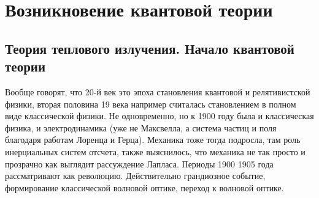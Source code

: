 \documentclass[a4paper, 12pt]{article}
\begin{document}

\section{Возникновение квантовой теории}

\subsection{Теория теплового излучения. Начало квантовой теории}

Вообще говорят, что 20-й век это эпоха становления квантовой 
и релятивистской физики, вторая половина 19 века например считалась 
становлением в полном виде классической физики. Не одновременно, но 
к 1900 году была и классическая физика, и электродинамика (уже не 
Максвелла, а система частиц и поля благодаря работам Лоренца и Герца). 
Механика тоже тогда подросла, там роль инерциальных систем отсчета, 
также выяснилось, что механика не так просто и прозрачно как выглядит 
рассуждение Лапласа. Периоды 1900 1905 года рассматривают как революцию. 
Действительно грандиозное событие, формирование классической волновой 
оптике, переход к волновой оптике.
\end{document}
